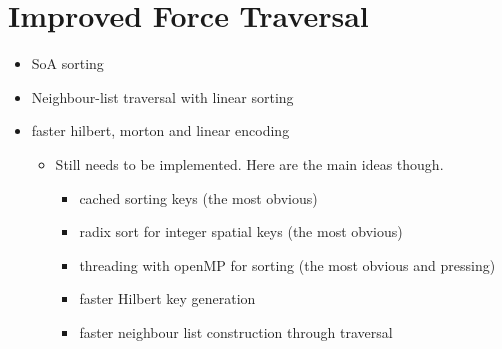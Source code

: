 \chapter{Improved Force Traversal}
\label{ch:improved_force_traversal}

\begin{itemize}
    \item SoA sorting
    \item Neighbour-list traversal with linear sorting
    \item faster hilbert, morton and linear encoding
    \begin{itemize}
        \item Still needs to be implemented. Here are the main ideas though.
        \begin{itemize}
            \item cached sorting keys (the most obvious)
            \item radix sort for integer spatial keys (the most obvious)
            \item threading with openMP for sorting (the most obvious and pressing)
            \item faster Hilbert key generation
            \item faster neighbour list construction through traversal
        \end{itemize}
    \end{itemize}
\end{itemize}

